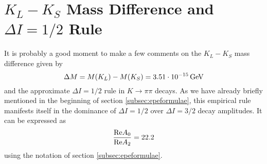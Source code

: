 \section{$K_L-K_S$ Mass Difference and $\Delta I=1/2$ Rule}
         \label{sec:mki12}
It is probably a good moment to make a few comments on the $K_L-K_S$
mass difference given by \begin{equation}\label{delmk} \Delta
M=M(K_L)-M(K_S)=3.51\cdot 10^{-15}\, {\rm GeV} \end{equation} and the
approximate $\Delta I=1/2$ rule in $K\to\pi\pi$ decays.  As we have
already briefly mentioned in the beginning of section
\ref{subsec:epeformulae}, this empirical rule manifests itself in the
dominance of $\Delta I=1/2$ over $\Delta I=3/2$ decay amplitudes.
It can be expressed as
\begin{equation}\label{deli12}
\frac{{\rm Re}A_0}{{\rm Re}A_2}=22.2
\end{equation}
using the notation of section \ref{subsec:epeformulae}.

